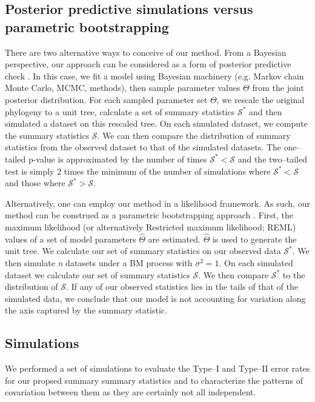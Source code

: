 \documentclass[12pt]{article}
\begin{document}
\subsection*{Posterior predictive simulations versus parametric bootstrapping}
There are two alternative ways to conceive of our method. From a Bayesian perspective, our approach can be considered as a form of posterior predictive check \citep{Rubin1984, Gelman1996, Gelman2003}. In this case, we fit a model using Bayesian machinery (e.g. Markov chain Monte Carlo, MCMC, methods), then sample parameter values $\Theta$ from the joint posterior distribution. For each sampled parameter set $\Theta$, we rescale the original phylogeny to a unit tree, calculate a set of summary statistics $\mathcal{S}^*$ and then simulated a dataset on this rescaled tree. On each simulated dataset, we compute the summary statistics $\mathcal{S}$. We can then compare the distribution of summary statistics from the observed dataset to that of the simulated datasets. The one--tailed p-value is approximated by the number of times $\mathcal{S}^* < \mathcal{S}$ and the two--tailed test is simply 2 times the minimum of the number of simulations where $\mathcal{S}^* < \mathcal{S}$ and those where $\mathcal{S}^* > \mathcal{S}$.

Alternatively, one can employ our method in a likelihood framework. As such, our method can be construed as a parametric bootstrapping approach \citep{Efronbootstrap}. First, the maximum likelihood (or alternatively Restricted maximum likelihood; REML) values of a set of model parameters $\hat{\Theta}$ are estimated. $\hat{\Theta}$ is used to  generate the unit tree. We calculate our set of summary statistics on our observed data $\mathcal{S}^*$. We then simulate \textit{n} datasets under a BM process with $\sigma^2 = 1$. On each simulated dataset we calculate our set of summary statistics $\mathcal{S}$. We then compare $\mathcal{S}^*$ to the distribution of $\mathcal{S}$. If any of our observed statistics lies in the tails of that of the simulated data, we conclude that our model is not accounting for variation along the axis captured by the summary statistic.


\subsection*{Simulations}

We performed a set of simulations to evaluate the Type--I and Type--II error rates for our propsed summary summary statistics and to characterize the patterns of covariation between them as they are certainly not all independent.
\end{document}

